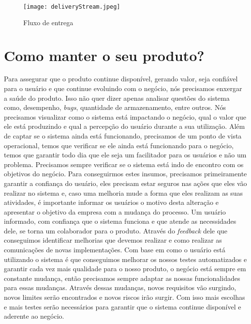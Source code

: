       \begin{figure}[!h]
        \centering
        \texttt{[image: deliveryStream.jpeg]}
        \caption{Fluxo de entrega}
        \label{Imagem:4}
      \end{figure}

  \chapter{Como manter o seu produto?}
    Para assegurar que o produto continue disponível, gerando valor, seja confiável
    para o usuário e que continue evoluindo com o negócio, nós precisamos enxergar
    a saúde do produto. Isso não quer dizer apenas analisar questões do sistema
    como, desempenho, \textit{bugs}, quantidade de armazenamento, entre outros.
    Nós precisamos visualizar como o sistema está impactando o negócio, qual o
    valor que ele está produzindo e qual a percepção do usuário durante a sua
    utilização. Além de captar se o sistema ainda está funcionando, precisamos de
    um ponto de vista operacional, temos que verificar se ele ainda está funcionando
    para o negócio, temos que garantir todo dia que ele seja um facilitador para
    os usuários e não um problema. Precisamos sempre verificar se o sistema está
    indo de encontro com os objetivos do negócio. \newline
    Para conseguirmos estes insumos, precisamos primeiramente garantir a confiança
    do usuário, eles precisam estar seguros nas ações que eles vão realizar no
    sistema e, caso uma melhoria mude a forma que eles realizam as suas atividades,
    é importante informar os usuários o motivo desta alteração e apresentar o
    objetivo da empresa com a mudança do processo. Um usuário informado, com
    confiança que o sistema funciona e que atende as necessidades dele, se torna
    um colaborador para o produto. Através do \textit{feedback} dele que conseguimos
    identificar melhorias que devemos realizar e como realizar as comunicações de
    novas implementações. Com base em como o usuário está utilizando o sistema
    é que conseguimos melhorar os nossos testes automatizados e garantir cada vez
    mais qualidade para o nosso produto, o negócio está sempre em constante
    mudança, então precisamos sempre adaptar as nossas funcionalidades para essas
    mudanças. Através dessas mudanças, novos requisitos vão surgindo, novos
    limites serão encontrados e novos riscos irão surgir. Com isso mais escolhas
    e mais testes serão necessários para garantir que o sistema continue disponível
    e aderente ao negócio.

